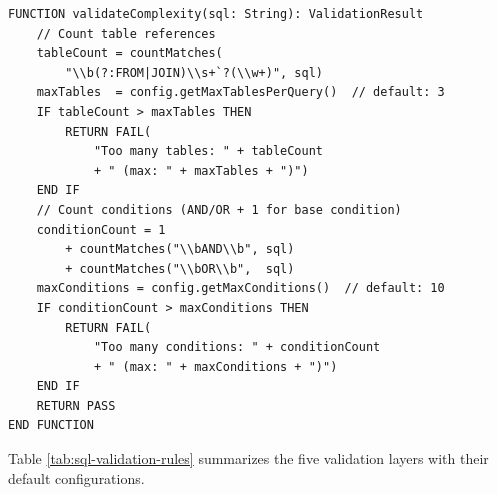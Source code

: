 \begin{table}[H]
\small\singlespacing
\centering
\caption{Pseudocode --- validateComplexity() Query Complexity Limits (Layer 5)}
\label{tab:pseudocode-validate-complexity}
\vspace{2mm}

\begin{lstlisting}
FUNCTION validateComplexity(sql: String): ValidationResult
    // Count table references
    tableCount = countMatches(
        "\\b(?:FROM|JOIN)\\s+`?(\\w+)", sql)
    maxTables  = config.getMaxTablesPerQuery()  // default: 3
    IF tableCount > maxTables THEN
        RETURN FAIL(
            "Too many tables: " + tableCount
            + " (max: " + maxTables + ")")
    END IF
    // Count conditions (AND/OR + 1 for base condition)
    conditionCount = 1
        + countMatches("\\bAND\\b", sql)
        + countMatches("\\bOR\\b",  sql)
    maxConditions = config.getMaxConditions()  // default: 10
    IF conditionCount > maxConditions THEN
        RETURN FAIL(
            "Too many conditions: " + conditionCount
            + " (max: " + maxConditions + ")")
    END IF
    RETURN PASS
END FUNCTION
\end{lstlisting}
\end{table}


Table \ref{tab:sql-validation-rules} summarizes the five validation layers with their default configurations.

\vspace{3mm}


